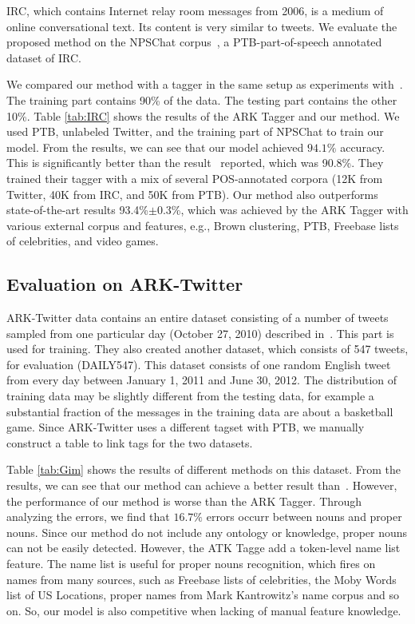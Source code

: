 \documentclass[11pt,letterpaper]{article}
\begin{document}
IRC, which contains Internet relay room messages from 2006, is a medium of online conversational text. Its content is very similar to tweets. We evaluate the proposed method on the NPSChat corpus~\cite{forsyth2007improving}, a PTB-part-of-speech annotated dataset of IRC.

We compared our method with a tagger in the same setup as experiments with~\cite{forsyth2007improving}. The training part contains 90\% of the data. The testing part contains the other 10\%. Table \ref{tab:IRC} shows the results of the ARK Tagger and our method. We used PTB, unlabeled Twitter, and the training part of NPSChat to train our model. From the results, we can see that our model achieved $94.1\%$ accuracy. This is significantly better than the result~\citet{forsyth2007improving} reported, which was 90.8\%. They trained their tagger with a mix of several POS-annotated corpora (12K from Twitter, 40K from IRC, and 50K from PTB). Our method also outperforms state-of-the-art results 93.4\%$\pm$0.3\%, which was achieved by the ARK Tagger with various external corpus and features, e.g., Brown clustering, PTB, Freebase lists of celebrities, and video games. 

\subsection{Evaluation on ARK-Twitter}
ARK-Twitter data contains an entire dataset consisting of a number of tweets sampled from one particular day (October 27, 2010) described in~\cite{gimpel2011part}. This part is used for training. They also created another dataset, which consists of 547 tweets, for evaluation (DAILY547). This dataset consists of one random English tweet from every day between January 1, 2011 and June 30, 2012. The distribution of training data may be slightly different from the testing data, for example a substantial fraction of the messages in the training data are about a basketball game. Since ARK-Twitter uses a different tagset with PTB, we manually construct a table to link tags for the two datasets. 

Table \ref{tab:Gim} shows the results of different methods on this dataset. From the results, we can see that our method can achieve a better result than~\cite{gimpel2011part}. However, the performance of our method is worse than the ARK Tagger. Through analyzing the errors, we find that $16.7\%$ errors occurr between nouns and proper nouns. Since our method do not include any ontology or knowledge, proper nouns can not be easily detected. However, the ATK Tagge add a token-level name list feature. The name list is useful for proper nouns recognition, which fires on names from many sources, such as Freebase lists of celebrities, the Moby Words list of US Locations, proper names from Mark Kantrowitz's name corpus and so on. So, our model is also competitive when lacking of manual feature knowledge.
\end{document}
